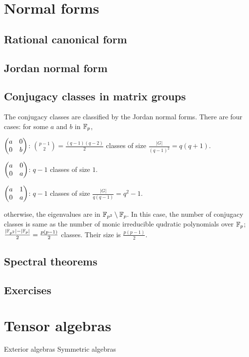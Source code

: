 \documentclass{../note}
\begin{document}
\chapter{Normal forms}
\section{Rational canonical form}
\begin{prb}
\end{prb}
\begin{prb}
\end{prb}
\section{Jordan normal form}


\section{Conjugacy classes in matrix groups}

\begin{prb}
The conjugacy classes are classified by the Jordan normal forms.
There are four cases: for some $a$ and $b$ in $\mathbb{F}_p$,
\begin{parts}
\item $\begin{pmatrix}a&0\\0&b\end{pmatrix}$: $\binom{p-1}2=\frac{(q-1)(q-2)}2$ classes of size $\frac{|G|}{(q-1)^2}=q(q+1)$.
\item $\begin{pmatrix}a&0\\0&a\end{pmatrix}$: $q-1$ classes of size $1$.
\item $\begin{pmatrix}a&1\\0&a\end{pmatrix}$: $q-1$ classes of size $\frac{|G|}{q(q-1)}=q^2-1$.
\item otherwise, the eigenvalues are in $\mathbb{F}_{p^2}\setminus\mathbb{F}_p$.
In this case, the number of conjugacy classes is same as the number of monic irreducible qudratic polynomials over $\mathbb{F}_p$; $\frac{|\mathbb{F}_{p^2}|-|\mathbb{F}_p|}2=\frac{p(p-1)}2$ classes.
Their size is $\frac{p(p-1)}2$.
\end{parts}
\end{prb}

\section{Spectral theorems}



\section*{Exercises}




\chapter{Tensor algebras}
Exterior algebras
Symmetric algebras
\end{document}
